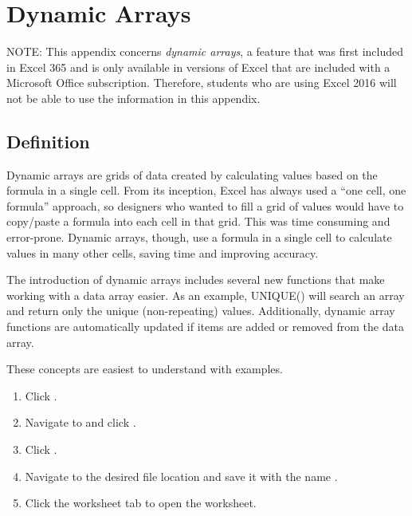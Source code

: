 \chapter{Dynamic Arrays}\label{app02:dynamic}

 NOTE: This appendix concerns \textit{dynamic arrays}, a feature that was first included in Excel 365 and is only available in versions of Excel that are included with a Microsoft Office subscription. Therefore, students who are using Excel 2016 will not be able to use the information in this appendix.

\section{Definition}

Dynamic arrays are grids of data created by calculating values based on the formula in a single cell. From its inception, Excel has always used a ``one cell, one formula'' approach, so designers who wanted to fill a grid of values would have to copy/paste a formula into each cell in that grid. This was time consuming and error-prone. Dynamic arrays, though, use a formula in a single cell to calculate values in many other cells, saving time and improving accuracy.

The introduction of dynamic arrays includes several new functions that make working with a data array easier. As an example, UNIQUE() will search an array and return only the unique (non-repeating) values. Additionally, dynamic array functions are automatically updated if items are added or removed from the data array.

These concepts are easiest to understand with examples.

\begin{enumbox}
	\begin{enumerate}
		\item Click .
		\item Navigate to  and click .
		\item Click .
		\item Navigate to the desired file location and save it with the name .
		\item Click the  worksheet tab to open the worksheet.
	\end{enumerate}
\end{enumbox}

